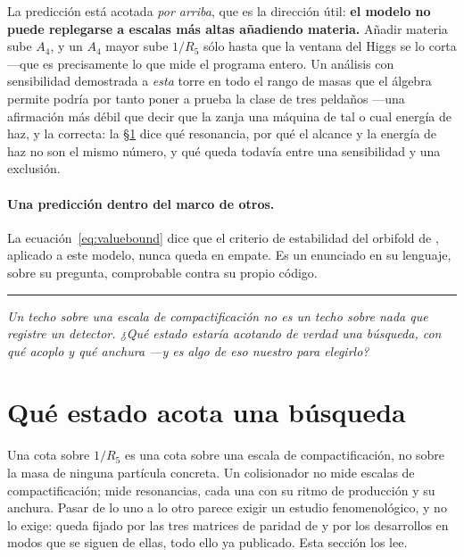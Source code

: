 \documentclass[11pt,a4paper]{article}
\newcommand{\bridge}[1]{\par\medskip\noindent
  \textcolor{hdrblue!45}{\rule{2.2cm}{0.6pt}}\;\;\parbox[t]{0.84\textwidth}{\small\itshape
  \textcolor{hdrblue!85}{#1}}\par\medskip}
\newenvironment{keyeq}
  {\begin{center}\setlength{\fboxsep}{9pt}\setlength{\fboxrule}{0.8pt}%
   \begin{lrbox}{\keyeqbox}\begin{minipage}{0.88\textwidth}}
  {\end{minipage}\end{lrbox}%
   \fcolorbox{hdrblue!55}{hdrblue!6}{\usebox{\keyeqbox}}\end{center}}
\begin{document}
\begin{keyeq}
La predicción está acotada \emph{por arriba}, que es la dirección útil: \textbf{el modelo no puede
replegarse a escalas más altas añadiendo materia.} Añadir materia sube $A_4$, y un $A_4$ mayor sube
$1/R_5$ sólo hasta que la ventana del Higgs se lo corta ---que es precisamente lo que mide el
programa entero. Un análisis con sensibilidad demostrada a \emph{esta} torre en todo el rango de
masas que el álgebra permite podría por tanto poner a prueba la clase de tres peldaños ---una
afirmación más débil que decir que la zanja una máquina de tal o cual energía de haz, y la
correcta: la \S\ref{sec:collider} dice qué resonancia, por qué el alcance y la energía de haz no
son el mismo número, y qué queda todavía entre una sensibilidad y una exclusión.
\end{keyeq}

\paragraph{Una predicción dentro del marco de otros.} La ecuación~\eqref{eq:valuebound} dice que el
criterio de estabilidad del orbifold de \cite{CCD24}, aplicado a este modelo, nunca queda en empate.
Es un enunciado en su lenguaje, sobre su pregunta, comprobable contra su propio código.

\bridge{Un techo sobre una escala de compactificación no es un techo sobre nada que registre un
detector. ¿Qué estado estaría acotando de verdad una búsqueda, con qué acoplo y qué anchura ---y
es algo de eso nuestro para elegirlo?}

\section{Qué estado acota una búsqueda}\label{sec:collider}

Una cota sobre $1/R_5$ es una cota sobre una escala de compactificación, no sobre la masa de
ninguna partícula concreta. Un colisionador no mide escalas de compactificación; mide resonancias,
cada una con su ritmo de producción y su anchura. Pasar de lo uno a lo otro parece exigir un
estudio fenomenológico, y no lo exige: queda fijado por las tres matrices de paridad de \cite{KM25}
y por los desarrollos en modos que se siguen de ellas, todo ello ya publicado. Esta sección los
lee.
\end{document}
